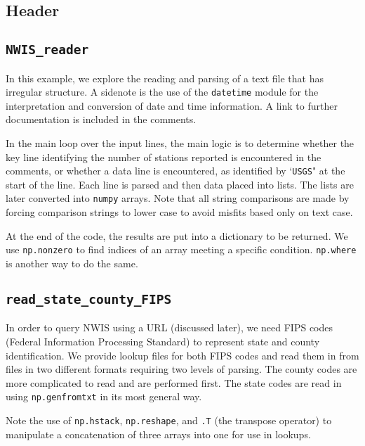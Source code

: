 \documentclass[12pt]{article}
\begin{document}
\subsection{Header}
\begin{center}
	
\end{center}
\subsection{\texttt{NWIS\_reader}}
In this example, we explore the reading and parsing of a text file that has irregular structure. A sidenote is the use of the \texttt{datetime} module for the interpretation and conversion of date and time information. A link to further documentation is included in the comments. 

In the main loop over the input lines, the main logic is to determine whether the key  line identifying the number of stations reported is encountered in the comments, or whether a data line is encountered, as identified by `\texttt{USGS}" at the start of the line. Each line is parsed and then data placed into lists. The lists are later converted into \texttt{numpy} arrays. Note that all string comparisons are made by forcing comparison strings to lower case to avoid misfits based only on text case.

At the end of the code, the results are put into a dictionary to be returned. We use \texttt{np.nonzero} to find indices of an array meeting a specific condition. \texttt{np.where} is another way to do the same.
\begin{center}
	
\end{center}

\subsection{\texttt{read\_state\_county\_FIPS}}
In order to query NWIS using a URL (discussed later), we need FIPS codes (Federal Information Processing Standard) to represent state and county identification. We provide lookup files for both FIPS codes and read them in from files in two different formats requiring two levels of parsing. The county codes are more complicated to read and are performed first. The state codes are read in using \texttt{np.genfromtxt} in its most general way.

Note the use of \texttt{np.hstack}, \texttt{np.reshape}, and \texttt{.T} (the transpose operator) to manipulate a concatenation of three arrays into one for use in lookups.
\end{document}
